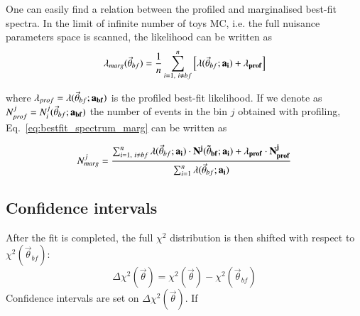 One can easily find a relation between the profiled and marginalised best-fit spectra.
In the limit of infinite number of toys MC, 
i.e. the full nuisance parameters space is scanned,
the likelihood can be written as
\begin{equation} \label{eq:likemarg_bf}
\lambda_{marg} (\vec{\theta}_{bf}) = \frac{1}{n} \sum_{i=1,~i \neq bf}^{n} \left[ \lambda (\vec{\theta}_{bf}; \bf{a_i}) + \lambda_{prof}  \right]
\end{equation}

where 
$\lambda_{prof} =  \lambda (\vec{\theta}_{bf}; \bf{a_{bf}})$ 
is the profiled best-fit likelihood. 
If we denote as
$N^j_{prof} = N_i^{j}(\vec{\theta}_{bf}; \bf{a_{bf}})$  
the number of events in the bin $j$ obtained with profiling,
Eq.~\ref{eq:bestfit_spectrum_marg} can be written as

\begin{equation} \label{eq:bestfit_spectrum}
N^j_{marg} = \frac{ \sum_{i=1,~i \neq bf}^{n} \lambda (\vec{\theta}_{bf}; \bf{a_i}) \cdot N^{j}(\vec{\theta}_{bf}; \bf{a_i}) + \lambda_{prof} \cdot N^{j}_{prof}  }{ \sum_{i=1}^{n} \lambda (\vec{\theta}_{bf}; \bf{a_i})  }
\end{equation}







\subsection{Confidence intervals}
\label{sec:cl}

After the fit is completed, 
the full $\chi^2$ distribution is then shifted with respect to $\chi^2 (\vec{\theta}_{bf})$:
\begin{equation} \label{eq:deltachisq}
\Delta \chi^2 (\vec{\theta}) = \chi^2(\vec{\theta}) - \chi^2(\vec{\theta}_{bf})
\end{equation}
Confidence intervals are set on $\Delta \chi^2 (\vec{\theta})$.
If 

